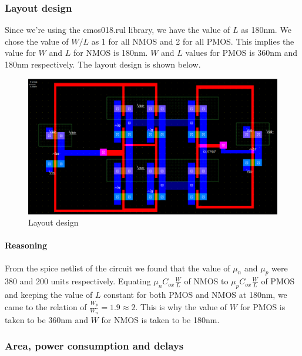 \documentclass[titlepage]{article}
\begin{document}
\subsubsection{Layout design}
Since we're using the cmos018.rul library, we have the value of $L$ as 180nm. We chose the value of $W/L$ as 1 for all NMOS and 2 for all PMOS. This implies the value for $W$ and $L$ for NMOS is 180nm. $W$ and $L$ values for PMOS is 360nm and 180nm respectively. The layout design is shown below.
\begin{figure}[ht]
    \centering
    \includegraphics[scale = 0.50]{Layout_Ass1a.png}
    \caption{Layout design}
    \label{fig2}
\end{figure}
\paragraph*{Reasoning}
From the spice netlist of the circuit we found that the value of $\mu_n$ and $\mu_p$ were 380 and 200 units respectively. Equating $\mu_nC_{ox}\frac WL$ of NMOS to $\mu_p C_{ox}\frac WL$ of PMOS and keeping the value of $L$ constant for both PMOS and NMOS at 180nm, we came to the relation of $\frac{W_p}{W_n} = 1.9 \approx 2$. This is why the value of $W$ for PMOS is taken to be 360nm and $W$ for NMOS is taken to be 180nm.
\newpage

\newpage
\subsubsection{Area, power consumption and delays}
\end{document}
